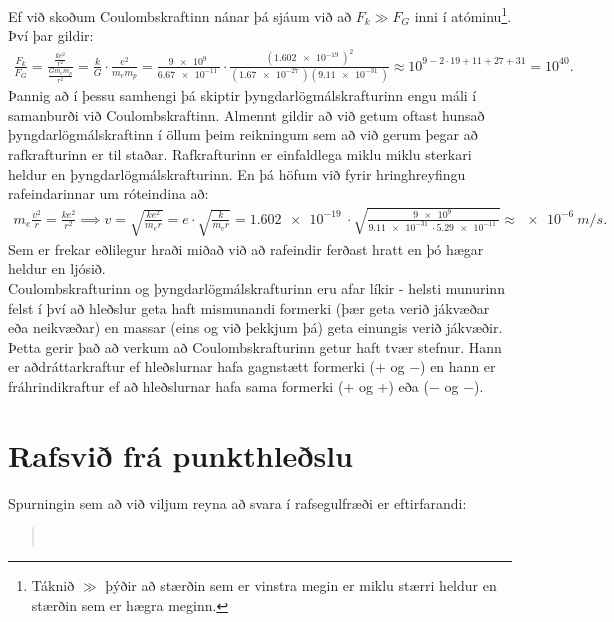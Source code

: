 Ef við skoðum Coulombskraftinn nánar þá sjáum við að $F_k \gg F_G$ inni í atóminu\footnote{Táknið $\gg$ þýðir að stærðin sem er vinstra megin er miklu stærri heldur en stærðin sem er hægra meginn.}. Því þar gildir:
\begin{align*}
    \frac{F_k}{F_G} = \frac{\frac{ke^2}{r^2}}{\frac{Gm_em_p}{r^2}} = \frac{k}{G} \cdot \frac{e^2}{m_e m_p} = \frac{\SI{9e9}{}}{\SI{6.67e-11}{}} \cdot \frac{(\SI{1.602e-19}{})^2}{(\SI{1.67e-27}{})(\SI{9.11e-31}{})} \approx 10^{9-2\cdot19 + 11 + 27+31} = 10^{40}.
\end{align*}
Þannig að í þessu samhengi þá skiptir þyngdarlögmálskrafturinn engu máli í samanburði við Coulombskraftinn. Almennt gildir að við getum oftast hunsað þyngdarlögmálskraftinn í öllum þeim reikningum sem að við gerum þegar að rafkrafturinn er til staðar. Rafkrafturinn er einfaldlega miklu miklu sterkari heldur en þyngdarlögmálskrafturinn. En þá höfum við fyrir hringhreyfingu rafeindarinnar um róteindina að:
\begin{align*}
    m_e \frac{v^2}{r} = \frac{ke^2}{r^2} \implies v = \sqrt{\frac{ke^2}{m_e r}} = e \cdot \sqrt{\frac{k}{m_e r}} = \SI{1.602e-19}{} \cdot \sqrt{\frac{\SI{9e9}{}}{\SI{9.11e-31}{}\cdot \SI{5.29e-11}{}}} \approx \SI{e-6}{m/s}.
\end{align*}
Sem er frekar eðlilegur hraði miðað við að rafeindir ferðast hratt en þó hægar heldur en ljósið. \\

Coulombskrafturinn og þyngdarlögmálskrafturinn eru afar líkir - helsti munurinn felst í því að hleðslur geta haft mismunandi formerki (þær geta verið jákvæðar eða neikvæðar) en massar (eins og við þekkjum þá) geta einungis verið jákvæðir. Þetta gerir það að verkum að Coulombskrafturinn getur haft tvær stefnur. Hann er aðdráttarkraftur ef hleðslurnar hafa gagnstætt formerki ($+$ og $-$) en hann er fráhrindikraftur ef að hleðslurnar hafa sama formerki ($+$ og $+$) eða ($-$ og $-$). \\

\section{Rafsvið frá punkthleðslu}

Spurningin sem að við viljum reyna að svara í rafsegulfræði er eftirfarandi:

\blockquote{ \\ \phantom{.} \hfill \textbf{}}



